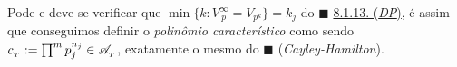 \begin{note}
    Pode e deve-se verificar que \(\min\{k: V_{\ p }^\infty = V_{p^k}\} = k_j\) do \(\blacksquare\) \hyperlink{thmDP}{8.1.13. (\emph{DP})}, é assim que conseguimos definir o \emph{polinômio característico} como sendo \(c_{_T} := \prod^m p_j^{n_j} \in \mathscr{A}_{_T}\), exatamente o mesmo do \(\blacksquare\) (\emph{Cayley-Hamilton}). 
\end{note}
 
